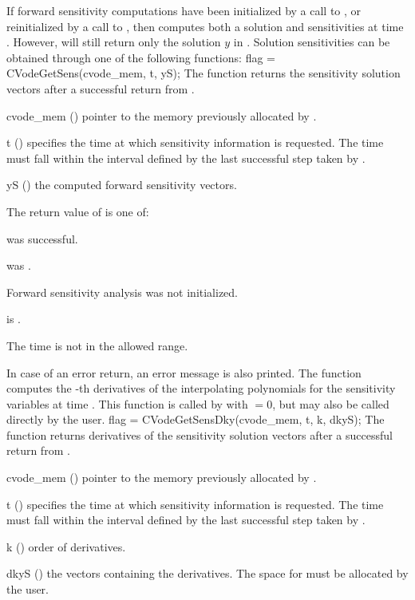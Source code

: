 If forward sensitivity computations have been initialized by a call to ,
or reinitialized by a call to , then {\cvodes} computes both a solution
and sensitivities at time . However,  will still return only the solution
$y$ in . Solution sensitivities can be obtained through one of the following functions:
{
  flag = CVodeGetSens(cvode\_mem, t, yS);
}
{
  The function  returns the sensitivity solution vectors after a
  successful return from .
}
{
  \begin{args}
  \item[cvode\_mem] ()
    pointer to the memory previously allocated by .
  \item[t] ()
    specifies the time at which sensitivity information is 
    requested. The time  must fall within the interval defined by the last 
    successful step taken by {\cvodes}.
  \item[yS] ()
    the computed forward sensitivity vectors.
  \end{args}
}
{
  The return value  of  is one of:
  \begin{args}
  \item[\Id{CV\_SUCCESS}] 
     was successful.
  \item[\Id{CV\_MEM\_NULL}] 
     was .
  \item[\Id{CV\_NO\_SENS}] 
    Forward sensitivity analysis was not initialized.
  \item[\Id{CV\_BAD\_DKY}] 
     is .
  \item[\Id{CV\_BAD\_T}]
    The time  is not in the allowed range.
  \end{args}
}
{
  In case of an error return, an error message is also printed.  
}
The function  computes the -th derivatives of the interpolating 
polynomials for the sensitivity variables at time .
This function is called by  with  $= 0$, but may also be called 
directly by the user.
{
  flag = CVodeGetSensDky(cvode\_mem, t, k, dkyS);
}
{
  The function  returns derivatives of the sensitivity solution 
  vectors after a successful return from .
}
{
  \begin{args}
  \item[cvode\_mem] ()
    pointer to the memory previously allocated by .
  \item[t] ()
    specifies the time at which sensitivity information is 
    requested. The time  must fall within the interval defined by the last 
    successful step taken by {\cvodes}.
  \item[k] () order of derivatives.
  \item[dkyS] ()
    the vectors containing the derivatives. The space for  must be allocated by 
    the user. 
  \end{args}
}
